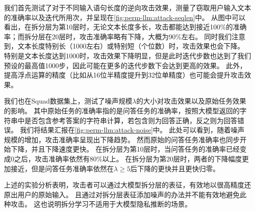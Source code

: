 %
我们首先测试了对于不同输入语句长度的逆向攻击效果，测量了窃取用户输入文本的准确率以及迭代所用次，并呈现在\autoref{fig:perm-llm:attack-seqlen}中。
%
从图中可以看出，在拆分层为第10层时，无论文本长度多长，攻击都能达到接近100\%的准确率；而拆分层在20层时，攻击准确率略有下降，大概为90\%左右。
同时我们注意到，文本长度特别长（1000左右）或特别短（个位数）时，攻击效果也会下降。
%
特别是文本长度达到1000时，攻击效果下降明显，但是此时迭代步数也达到了我们预设的最高值1000步，因此可能在更多的迭代步数下会达到更高的效果。
%
此外，提高浮点运算的精度（比如从16位半精度提升到32位单精度）也可能会提升攻击效果。


我们也在Squad数据集上，测试了噪声规模$\lambda$的大小对攻击效果以及原始任务效果的影响。
其中原始任务的准确率指的是问答任务的准确率，按照大模型返回的字符串中是否包含参考答案的字符串计算，若包含则为回答正确，反之则为回答错误。
%
我们将结果汇报在\autoref{fig:perm-llm:attack-noise}中。
%
此处可以看到，随着噪声规模的增加，攻击准确率呈现出下降趋势。
然而原始的问答任务准确率也同步开始下降，并且下降速度更快。
%
在拆分层为第10层时，当问答任务的准确率已经变成0之后，攻击准确率依然有80\%以上。
在拆分层为第20层时，两者的下降幅度更加接近，但是问答任务准确率依然在$\lambda \ge 5$后下降的更快并且更快归零。
%



上述的实验分析表明，攻击者可以通过大模型拆分层的表征，有效地以很高精度还原出用户的原始输入。
%
且通过对拆分层表征添加噪声的办法并不能有效地避免此种攻击。
%
这也说明拆分学习不适用于大模型隐私推断的场景。
